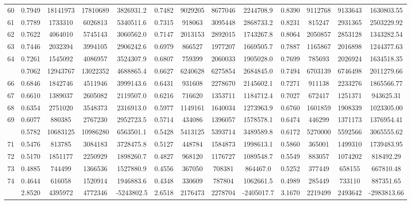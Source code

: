 \documentclass[
  12pt,
]{article}
\begin{document}
\begin{longtable}[t]{lcccccccccccc}
60 & 0.7949 & 18141973 & 17810689 & 3826931.2 & 0.7482 & 9029205 & 8677046 & 2244708.9 & 0.8390 & 9112768 & 9133643 & 1630803.55\\
61 & 0.7789 & 1733310 & 6026813 & 5340511.6 & 0.7315 & 918063 & 3095448 & 2868733.2 & 0.8231 & 815247 & 2931365 & 2503229.92\\
62 & 0.7622 & 4064010 & 5745143 & 3060562.0 & 0.7147 & 2013153 & 2892015 & 1743267.8 & 0.8064 & 2050857 & 2853128 & 1343282.54\\
63 & 0.7446 & 2032394 & 3994105 & 2906242.6 & 0.6979 & 866527 & 1977207 & 1669505.7 & 0.7887 & 1165867 & 2016898 & 1244377.63\\
64 & 0.7261 & 1545092 & 4086957 & 3524307.9 & 0.6807 & 759399 & 2060033 & 1905028.0 & 0.7699 & 785693 & 2026924 & 1634518.35\\
\addlinespace
65 & 0.7062 & 12943767 & 13022352 & 4688865.4 & 0.6627 & 6240628 & 6275854 & 2684845.0 & 0.7494 & 6703139 & 6746498 & 2011279.66\\
66 & 0.6846 & 1842746 & 4511946 & 3999143.6 & 0.6431 & 931608 & 2278670 & 2145602.1 & 0.7271 & 911138 & 2233276 & 1865566.77\\
67 & 0.6610 & 1389037 & 2605082 & 2119507.0 & 0.6216 & 716620 & 1353711 & 1184712.4 & 0.7027 & 672417 & 1251371 & 943625.31\\
68 & 0.6354 & 2751020 & 3548373 & 2316913.0 & 0.5977 & 1149161 & 1640034 & 1273963.9 & 0.6760 & 1601859 & 1908339 & 1023305.00\\
69 & 0.6077 & 880385 & 2767230 & 2952723.5 & 0.5714 & 434086 & 1396057 & 1578578.1 & 0.6474 & 446299 & 1371173 & 1376954.41\\
\addlinespace
70 & 0.5782 & 10683125 & 10986280 & 6563501.1 & 0.5428 & 5413125 & 5393714 & 3489589.8 & 0.6172 & 5270000 & 5592566 & 3065555.62\\
71 & 0.5476 & 813785 & 3084183 & 3728475.8 & 0.5127 & 448784 & 1584873 & 1998613.1 & 0.5860 & 365001 & 1499310 & 1739483.95\\
72 & 0.5170 & 1851177 & 2250929 & 1898260.7 & 0.4827 & 968120 & 1176727 & 1089548.7 & 0.5549 & 883057 & 1074202 & 818492.29\\
73 & 0.4885 & 744499 & 1366536 & 1527880.9 & 0.4556 & 367050 & 708381 & 864467.0 & 0.5252 & 377449 & 658155 & 667810.48\\
74 & 0.4644 & 616058 & 1520914 & 1946883.6 & 0.4348 & 330609 & 787804 & 1062661.5 & 0.4989 & 285449 & 733110 & 887351.65\\
\addlinespace
75 & 2.8520 & 4395972 & 4772346 & -5243802.5 & 2.6518 & 2176473 & 2278704 & -2405017.7 & 3.1670 & 2219499 & 2493642 & -2983813.66\\*
\end{longtable}
\endgroup{}
\end{document}
